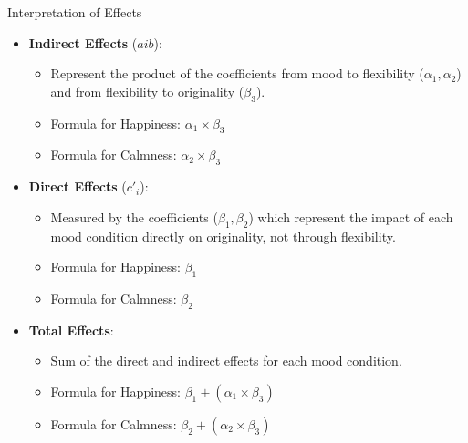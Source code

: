 \documentclass[pdf]{beamer}
\begin{document}
\begin{frame}{Interpretation of Effects}
\begin{itemize}
    \item \textbf{Indirect Effects} ($aib$):
    \begin{itemize}
        \item Represent the product of the coefficients from mood to flexibility ($\alpha_1, \alpha_2$) and from flexibility to originality ($\beta_3$).
        \item Formula for Happiness: $\alpha_1 \times \beta_3$
        \item Formula for Calmness: $\alpha_2 \times \beta_3$
    \end{itemize}
    \item \textbf{Direct Effects} ($c'_{i}$):
    \begin{itemize}
        \item Measured by the coefficients ($\beta_1, \beta_2$) which represent the impact of each mood condition directly on originality, not through flexibility.
        \item Formula for Happiness: $\beta_1$
        \item Formula for Calmness: $\beta_2$
    \end{itemize}
    \item \textbf{Total Effects}:
    \begin{itemize}
        \item Sum of the direct and indirect effects for each mood condition.
        \item Formula for Happiness: $\beta_1 + (\alpha_1 \times \beta_3)$
        \item Formula for Calmness: $\beta_2 + (\alpha_2 \times \beta_3)$
    \end{itemize}
\end{itemize}
\end{frame}
\end{document}
